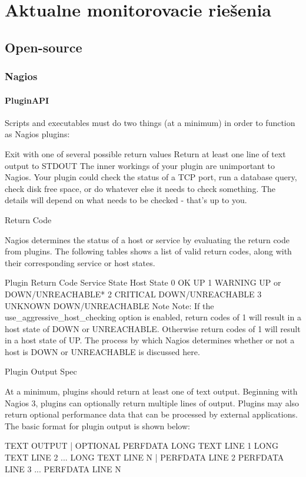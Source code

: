 \documentclass[11pt,final,oneside]{fithesis}
\begin{document}
\chapter{Aktualne monitorovacie riešenia}
\section{Open-source}
\subsection{Nagios}
\subsubsection{PluginAPI}
Scripts and executables must do two things (at a minimum) in order to function as Nagios plugins:

Exit with one of several possible return values
Return at least one line of text output to STDOUT
The inner workings of your plugin are unimportant to Nagios. Your plugin could check the status of a TCP port, run a database query, check disk free space, or do whatever else it needs to check something. The details will depend on what needs to be checked - that's up to you.

Return Code

Nagios determines the status of a host or service by evaluating the return code from plugins. The following tables shows a list of valid return codes, along with their corresponding service or host states.

Plugin Return Code	Service State	Host State
0	OK	UP
1	WARNING	UP or DOWN/UNREACHABLE*
2	CRITICAL	DOWN/UNREACHABLE
3	UNKNOWN	DOWN/UNREACHABLE
Note Note: If the use_aggressive_host_checking option is enabled, return codes of 1 will result in a host state of DOWN or UNREACHABLE. Otherwise return codes of 1 will result in a host state of UP. The process by which Nagios determines whether or not a host is DOWN or UNREACHABLE is discussed here.

Plugin Output Spec

At a minimum, plugins should return at least one of text output. Beginning with Nagios 3, plugins can optionally return multiple lines of output. Plugins may also return optional performance data that can be processed by external applications. The basic format for plugin output is shown below:

TEXT OUTPUT | OPTIONAL PERFDATA
LONG TEXT LINE 1
LONG TEXT LINE 2
...
LONG TEXT LINE N | PERFDATA LINE 2
PERFDATA LINE 3
...
PERFDATA LINE N
\end{document}
